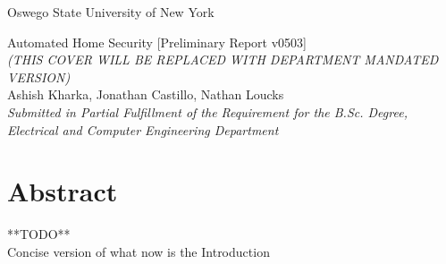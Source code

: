 \documentclass[a4paper,11pt]{report}
\title{}
\date{February 15, 2020}
\author{Nathan Louck}
\begin{document}
	\begin{titlepage}
		\begin{center}
			\large
			Oswego State University of New York \\ 
			\vspace{2.5in}
		
			Automated Home Security [Preliminary Report v0503] \\ 
			\tiny\textit{(THIS COVER WILL BE REPLACED WITH DEPARTMENT MANDATED VERSION)}\\
			\vspace{2in}
			\normalsize 
			Ashish Kharka, Jonathan Castillo, Nathan Loucks \\
			\vspace{0.5in}
			\small\textit{
				Submitted in Partial Fulfillment of the Requirement for the B.Sc. Degree, 	\\Electrical and Computer Engineering Department
			}
		\end{center}
	\end{titlepage}
	\newpage
	\section{Abstract}
	{
	\centering
	**TODO**\\
	Concise version of what now is the Introduction
	}
\end{document}
